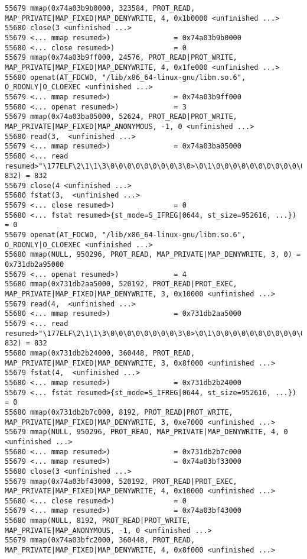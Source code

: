 \begin{verbatim}
55679 mmap(0x74a03b9b0000, 323584, PROT_READ, MAP_PRIVATE|MAP_FIXED|MAP_DENYWRITE, 4, 0x1b0000 <unfinished ...>
55680 close(3 <unfinished ...>
55679 <... mmap resumed>)               = 0x74a03b9b0000
55680 <... close resumed>)              = 0
55679 mmap(0x74a03b9ff000, 24576, PROT_READ|PROT_WRITE, MAP_PRIVATE|MAP_FIXED|MAP_DENYWRITE, 4, 0x1fe000 <unfinished ...>
55680 openat(AT_FDCWD, "/lib/x86_64-linux-gnu/libm.so.6", O_RDONLY|O_CLOEXEC <unfinished ...>
55679 <... mmap resumed>)               = 0x74a03b9ff000
55680 <... openat resumed>)             = 3
55679 mmap(0x74a03ba05000, 52624, PROT_READ|PROT_WRITE, MAP_PRIVATE|MAP_FIXED|MAP_ANONYMOUS, -1, 0 <unfinished ...>
55680 read(3,  <unfinished ...>
55679 <... mmap resumed>)               = 0x74a03ba05000
55680 <... read resumed>"\177ELF\2\1\1\3\0\0\0\0\0\0\0\0\3\0>\0\1\0\0\0\0\0\0\0\0\0\0\0"..., 832) = 832
55679 close(4 <unfinished ...>
55680 fstat(3,  <unfinished ...>
55679 <... close resumed>)              = 0
55680 <... fstat resumed>{st_mode=S_IFREG|0644, st_size=952616, ...}) = 0
55679 openat(AT_FDCWD, "/lib/x86_64-linux-gnu/libm.so.6", O_RDONLY|O_CLOEXEC <unfinished ...>
55680 mmap(NULL, 950296, PROT_READ, MAP_PRIVATE|MAP_DENYWRITE, 3, 0) = 0x731db2a95000
55679 <... openat resumed>)             = 4
55680 mmap(0x731db2aa5000, 520192, PROT_READ|PROT_EXEC, MAP_PRIVATE|MAP_FIXED|MAP_DENYWRITE, 3, 0x10000 <unfinished ...>
55679 read(4,  <unfinished ...>
55680 <... mmap resumed>)               = 0x731db2aa5000
55679 <... read resumed>"\177ELF\2\1\1\3\0\0\0\0\0\0\0\0\3\0>\0\1\0\0\0\0\0\0\0\0\0\0\0"..., 832) = 832
55680 mmap(0x731db2b24000, 360448, PROT_READ, MAP_PRIVATE|MAP_FIXED|MAP_DENYWRITE, 3, 0x8f000 <unfinished ...>
55679 fstat(4,  <unfinished ...>
55680 <... mmap resumed>)               = 0x731db2b24000
55679 <... fstat resumed>{st_mode=S_IFREG|0644, st_size=952616, ...}) = 0
55680 mmap(0x731db2b7c000, 8192, PROT_READ|PROT_WRITE, MAP_PRIVATE|MAP_FIXED|MAP_DENYWRITE, 3, 0xe7000 <unfinished ...>
55679 mmap(NULL, 950296, PROT_READ, MAP_PRIVATE|MAP_DENYWRITE, 4, 0 <unfinished ...>
55680 <... mmap resumed>)               = 0x731db2b7c000
55679 <... mmap resumed>)               = 0x74a03bf33000
55680 close(3 <unfinished ...>
55679 mmap(0x74a03bf43000, 520192, PROT_READ|PROT_EXEC, MAP_PRIVATE|MAP_FIXED|MAP_DENYWRITE, 4, 0x10000 <unfinished ...>
55680 <... close resumed>)              = 0
55679 <... mmap resumed>)               = 0x74a03bf43000
55680 mmap(NULL, 8192, PROT_READ|PROT_WRITE, MAP_PRIVATE|MAP_ANONYMOUS, -1, 0 <unfinished ...>
55679 mmap(0x74a03bfc2000, 360448, PROT_READ, MAP_PRIVATE|MAP_FIXED|MAP_DENYWRITE, 4, 0x8f000 <unfinished ...>

\end{verbatim}
